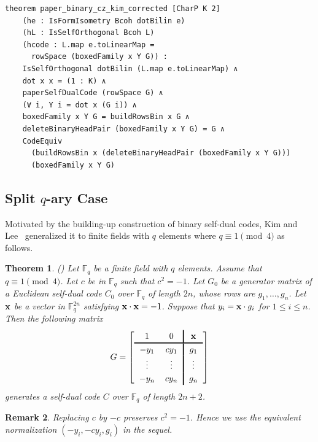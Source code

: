 \documentclass[12pt]{article}
\newtheorem{theorem}{Theorem}[section]
\newtheorem{remark}[theorem]{Remark}
\begin{document}
\begin{lstlisting}[caption={Lean for Theorem~\ref{thm:binary-cz-kim}.}]
theorem paper_binary_cz_kim_corrected [CharP K 2]
    (he : IsFormIsometry Bcoh dotBilin e)
    (hL : IsSelfOrthogonal Bcoh L)
    (hcode : L.map e.toLinearMap =
      rowSpace (boxedFamily x Y G)) :
    IsSelfOrthogonal dotBilin (L.map e.toLinearMap) ∧
    dot x x = (1 : K) ∧
    paperSelfDualCode (rowSpace G) ∧
    (∀ i, Y i = dot x (G i)) ∧
    boxedFamily x Y G = buildRowsBin x G ∧
    deleteBinaryHeadPair (boxedFamily x Y G) = G ∧
    CodeEquiv
      (buildRowsBin x (deleteBinaryHeadPair (boxedFamily x Y G)))
      (boxedFamily x Y G)
\end{lstlisting}

\subsection{\texorpdfstring{\hspace{0.2em}Split \(q\)-ary Case}{Split q-ary Case}}

Motivated by the building-up construction of binary self-dual codes, Kim and Lee~\cite{KimLee} generalized it to finite fields with $q$ elements where $q \equiv 1 \pmod{4}$ as follows.

\begin{theorem}(\cite[Proposition 2.1]{KimLee}) \label{thm-q-ary-build-1}
Let $\mathbb F_q$ be a finite field with $q$ elements. Assume that $q \equiv 1 \pmod{4}$. Let $c$ be in $\mathbb F_q$ such that $c^2 = -1$. Let $G_0$ be a generator matrix of a Euclidean self-dual code $C_0$ over $\mathbb F_q$ of length $2n$, whose rows are $g_1, \dots, g_n$. Let $\bf x$ be a vector in $\mathbb F_q^{2n}$ satisfying ${\bf x} \cdot {\bf x} = -1$. Suppose that $y_i ={\bf x} \cdot g_i$ for $1 \le i \le n$. Then the following matrix
\[
\begingroup
\setlength{\arraycolsep}{6pt}
\renewcommand{\arraystretch}{1.2}
G=
\left[
\begin{array}{cc!{\vrule width 1.2pt}c}
1 & 0 & \mathbf{x}\\
\noalign{\hrule height 1.2pt}
-y_1 & c y_1 & g_1\\
\vdots & \vdots & \vdots\\
-y_n & c y_n & g_n
\end{array}
\right]
\endgroup
\]
generates a self-dual code $C$ over $\mathbb F_q$ of length $2n+2$.
\end{theorem}

\begin{remark}
\rm
Replacing \(c\) by \(-c\) preserves \(c^2=-1\).  Hence we use the equivalent
normalization \((-y_i,-cy_i,g_i)\) in the sequel.
\end{remark}
\end{document}
